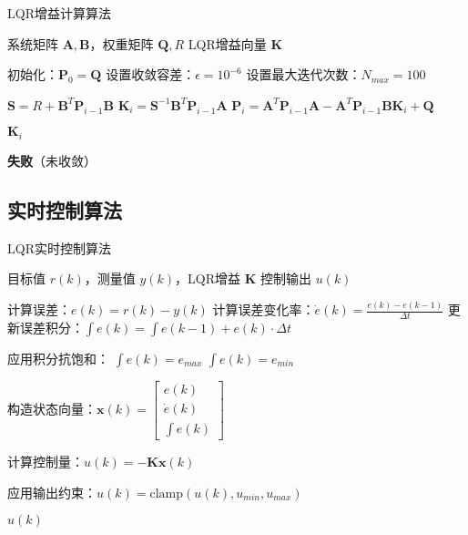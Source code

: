 \documentclass{article}
\begin{document}
\begin{algorithm}[H]
\caption{LQR增益计算算法}
\begin{algorithmic}[1]
\Require 系统矩阵 $\mathbf{A}, \mathbf{B}$，权重矩阵 $\mathbf{Q}, R$
\Ensure LQR增益向量 $\mathbf{K}$

\State 初始化：$\mathbf{P}_0 = \mathbf{Q}$
\State 设置收敛容差：$\epsilon = 10^{-6}$
\State 设置最大迭代次数：$N_{max} = 100$

    \State $\mathbf{S} = R + \mathbf{B}^T\mathbf{P}_{i-1}\mathbf{B}$
    \State $\mathbf{K}_i = \mathbf{S}^{-1}\mathbf{B}^T\mathbf{P}_{i-1}\mathbf{A}$
    \State $\mathbf{P}_i = \mathbf{A}^T\mathbf{P}_{i-1}\mathbf{A} - \mathbf{A}^T\mathbf{P}_{i-1}\mathbf{B}\mathbf{K}_i + \mathbf{Q}$
    
        \State \Return $\mathbf{K}_i$
    \EndIf
\EndFor

\State \Return \textbf{失败}（未收敛）
\end{algorithmic}
\end{algorithm}

\subsection{实时控制算法}

\begin{algorithm}[H]
\caption{LQR实时控制算法}
\begin{algorithmic}[1]
\Require 目标值 $r(k)$，测量值 $y(k)$，LQR增益 $\mathbf{K}$
\Ensure 控制输出 $u(k)$

\State 计算误差：$e(k) = r(k) - y(k)$
\State 计算误差变化率：$\dot{e}(k) = \frac{e(k) - e(k-1)}{\Delta t}$
\State 更新误差积分：$\int e(k) = \int e(k-1) + e(k) \cdot \Delta t$

\State 应用积分抗饱和：
    \State $\int e(k) = e_{max}$
    \State $\int e(k) = e_{min}$
\EndIf

\State 构造状态向量：$\mathbf{x}(k) = \begin{bmatrix} e(k) \\ \dot{e}(k) \\ \int e(k) \end{bmatrix}$

\State 计算控制量：$u(k) = -\mathbf{K}\mathbf{x}(k)$

\State 应用输出约束：$u(k) = \text{clamp}(u(k), u_{min}, u_{max})$

\State \Return $u(k)$
\end{algorithmic}
\end{algorithm}
\end{document}
